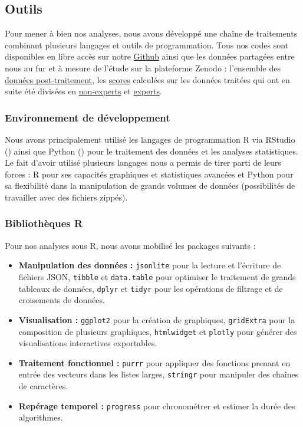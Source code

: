 \documentclass[a4paper,12pt]{article}
\begin{document}

\subsection{Outils}

Pour mener à bien nos analyses, nous avons développé une chaîne de traitements combinant plusieurs langages et outils de programmation. Tous nos codes sont disponibles en libre accès sur notre \href{https://github.com/lcletz/PLANTNET_M1_SSD}{Github} ainsi que les données partagées entre nous au fur et à mesure de l'étude sur la plateforme Zenodo : l'ensemble des \href{https://zenodo.org/records/15355864}{données post-traitement}, les \href{https://zenodo.org/records/15353081}{scores} calculées sur les données traitées qui ont en suite été divisées en \href{https://zenodo.org/records/15358242}{non-experts} et \href{https://zenodo.org/records/15441471}{experts}.

\subsubsection{Environnement de développement}

Nous avons principalement utilisé les langages de programmation R via RStudio (\cite{RStudio}) ainsi que Python (\cite{Python}) pour le traitement des données et les analyses statistiques. Le fait d'avoir utilisé plusieurs langages nous a permis de tirer parti de leurs forces : R pour ses capacités graphiques et statistiques avancées et Python pour sa flexibilité dans la manipulation de grands volumes de données (possibilités de travailler avec des fichiers zippés).

\subsubsection{Bibliothèques R}

Pour nos analyses sous R, nous avons mobilisé les packages suivants :
\begin{itemize}
    \item \textbf{Manipulation des données :} \texttt{jsonlite} pour la lecture et l'écriture de fichiers JSON, \texttt{tibble} et \texttt{data.table} pour optimiser le traitement de grands tableaux de données, \texttt{dplyr} et \texttt{tidyr} pour les opérations de filtrage et de croisements de données.
    \item \textbf{Visualisation :} \texttt{ggplot2} pour la création de graphiques, \texttt{gridExtra} pour la composition de plusieurs graphiques, \texttt{htmlwidget} et \texttt{plotly} pour générer des visualisations interactives exportables.
    \item \textbf{Traitement fonctionnel :} \texttt{purrr} pour appliquer des fonctions prenant en entrée des vecteurs dans les listes larges, \texttt{stringr} pour manipuler des chaînes de caractères.
    \item \textbf{Repérage temporel :} \texttt{progress} pour chronométrer et estimer la durée des algorithmes.
\end{itemize}
\end{document}
